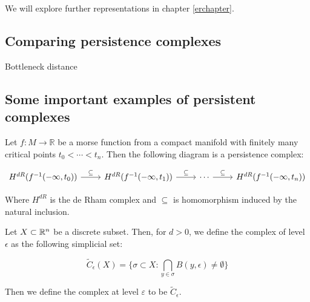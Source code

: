 We will explore further representations in chapter \ref{erchapter}.



\subsection{Comparing persistence complexes}
\label{bottle}
{\color{red} Bottleneck distance}

\begin{definition}
    
\end{definition}


\subsection{Some important examples of persistent complexes}
\label{examplespersistence}

\begin{definition}
Let $f:M\to\mathbb{R}$ be a morse function from a compact manifold 
with finitely many critical points $t_0<\cdots<t_n$. Then the following diagram
is a persistence complex:

$$
\begin{tikzcd}
H^{dR}(f^{-1}(-\infty,t_0)) \arrow[r,"\subseteq"]
& H^{dR}(f^{-1}(-\infty,t_1)) \arrow[r,"\subseteq"]
& \cdots\arrow[r,"\subseteq"]
& H^{dR}(f^{-1}(-\infty,t_n))
\end{tikzcd}
$$

Where $H^{dR}$ is the de Rham complex and $\subseteq$
is homomorphism induced by the natural inclusion.

\end{definition}

\begin{definition}

Let $X\subset \mathbb{R}^n$ be a discrete subset. Then, for $d>0$, we define the {\Cech}
complex of level $\epsilon$ as the following simplicial set:


$$
\tilde{C}_\epsilon(X)
=
\{
\sigma \subset X :
\bigcap_{y\in\sigma} B(y,\epsilon)\neq \emptyset
\}
$$

Then we define the {\Cech} complex at level $\varepsilon$ to be $\tilde{C}_\epsilon$.

\end{definition}


